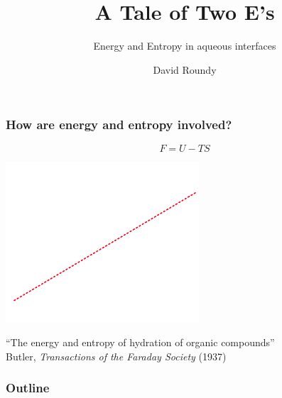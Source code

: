 \documentclass{beamer}
\title{A Tale of Two E's}
\subtitle{Energy and Entropy in aqueous interfaces}
\author{David Roundy}
\newcommand\mycite[3]{{\small #1, \textit{#2} (#3)}}
\begin{document}
{
\begin{frame}
  \titlepage

\end{frame}
}

\begin{frame}
  \frametitle{How are energy and entropy involved?}
  \vspace{-1em}
  \[F = U - TS\]
  \begin{center}
    \includegraphics[height=6cm]{figs/hydration-plot-nice}
  \end{center}
  ``The energy and entropy of hydration of organic compounds''
  \\ \hfill \mycite{Butler}{Transactions of the Faraday Society}{1937}
\end{frame}

\begin{frame}
  \frametitle{Outline}
  \tableofcontents
\end{frame}








\end{document}

